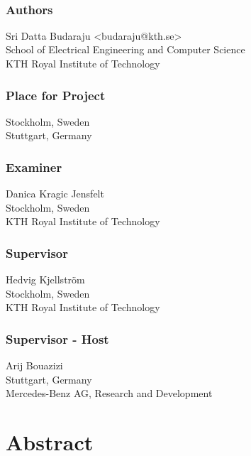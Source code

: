 \newpage
\thispagestyle{plain}
~\\
\vfill
{ 
    \subsection*{Authors}
    Sri Datta Budaraju <budaraju@kth.se>\\
    School of Electrical Engineering and Computer Science\\
    KTH Royal Institute of Technology
    
    \subsection*{Place for Project}
    Stockholm, Sweden\\
    Stuttgart, Germany

    \subsection*{Examiner}
    Danica Kragic Jensfelt\\
    Stockholm, Sweden\\
    KTH Royal Institute of Technology
    
    \subsection*{Supervisor }
    Hedvig Kjellström\\
    Stockholm, Sweden\\
    KTH Royal Institute of Technology
    
    \subsection*{Supervisor - Host}
    Arij Bouazizi\\
    Stuttgart, Germany\\
    Mercedes-Benz AG,  Research and Development
    ~
}

\newpage
\thispagestyle{plain}
\chapter*{Abstract}


